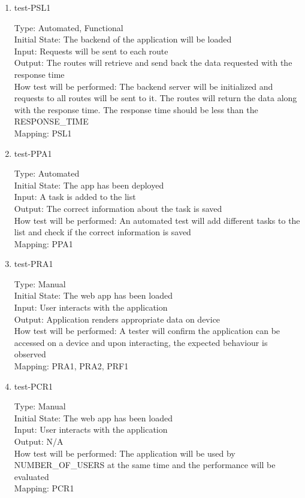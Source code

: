 \documentclass[12pt, titlepage]{article}
\begin{document}
\begin{enumerate}
\item{test-PSL1\\}

Type: Automated, Functional\\
Initial State: The backend of the application will be loaded\\
Input: Requests will be sent to each route\\
Output: The routes will retrieve and send back the data requested with the response time\\
How test will be performed: The backend server will be initialized and requests to all routes will be sent to it. The routes will return the data along with the response time. The response time should be less than the RESPONSE\_TIME\\
Mapping: PSL1

\item{test-PPA1\\}

Type: Automated\\
Initial State: The app has been deployed\\
Input: A task is added to the list\\
Output: The correct information about the task is saved\\
How test will be performed: An automated test will add different tasks to the list and check if the correct information is saved\\
Mapping: PPA1\\

\item{test-PRA1\\}

Type: Manual\\
Initial State: The web app has been loaded\\
Input: User interacts with the application\\
Output: Application renders appropriate data on device\\
How test will be performed: A tester will confirm the application can be accessed on a device and upon interacting, the expected behaviour is observed\\
Mapping: PRA1, PRA2, PRF1\\

\item{test-PCR1\\}

Type: Manual\\
Initial State: The web app has been loaded\\
Input: User interacts with the application\\
Output: N/A\\
How test will be performed: The application will be used by NUMBER\_OF\_USERS at the same time and the performance will be evaluated\\
Mapping: PCR1\\
\end{enumerate}
\end{document}
